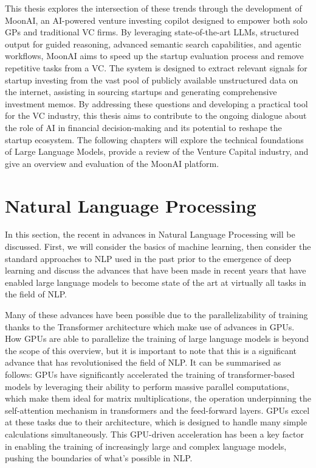 \documentclass[a4paper, oneside]{discothesis}
\begin{document}
This thesis explores the intersection of these trends through the development of MoonAI, an
AI-powered venture investing copilot designed to empower both solo GPs and traditional VC firms.
By leveraging state-of-the-art LLMs, structured output for guided reasoning, advanced
semantic search capabilities, and agentic workflows, MoonAI aims to speed up the startup evaluation process and remove repetitive tasks from a VC. The
system is designed to extract relevant signals for startup investing from the vast pool of
publicly available unstructured data on the internet, assisting in sourcing startups and
generating comprehensive investment memos. By addressing these questions and developing a practical tool for the VC industry, this thesis
aims to contribute to the ongoing dialogue about the role of AI in financial decision-making and
its potential to reshape the startup ecosystem. The following chapters will explore the
technical foundations of Large Language Models, provide a review of the Venture Capital industry, and give an overview and evaluation of the MoonAI platform. 

\chapter{Natural Language Processing}

In this section, the recent in advances in Natural Language Processing will be discussed. First, we will consider the basics of machine learning, 
then consider the standard approaches to NLP used in the past prior to the emergence of deep learning and discuss the advances that have been made in recent years that have enabled large language models to become state of the art at virtually all tasks in the field of NLP.

Many of these advances have been possible due to the parallelizability of training thanks to the Transformer architecture which make use of advances in GPUs. How GPUs are able to parallelize the training of large language models is beyond the scope of this overview, but it is important to note that this is a significant advance that has revolutionised the field of NLP. It can be summarised as follows: GPUs have significantly accelerated the training of transformer-based models by leveraging their ability to perform massive parallel computations, which make them ideal for matrix multiplications, the operation underpinning the self-attention mechanism in transformers and the feed-forward layers. 
GPUs excel at these tasks due to their architecture, which is designed to handle many simple calculations simultaneously.
This GPU-driven acceleration has been a key factor in enabling the training of increasingly large and complex language models, pushing the boundaries of what's possible in NLP.
\end{document}
